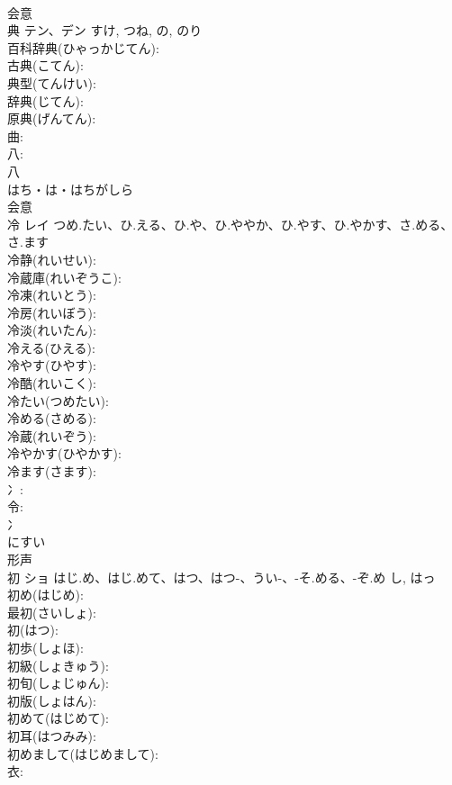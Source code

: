 \documentclass[8pt]{extreport}
\begin{document}
\begin{CJK}{UTF8}{min}
\\	会意 
\\	典	テン、デン		すけ, つね, の, のり	
\\	百科辞典(ひゃっかじてん): 
\\	古典(こてん): 
\\	典型(てんけい): 
\\	辞典(じてん): 
\\	原典(げんてん): 
\\	曲: 
\\	八: 
\\	八	
\\	はち・は・はちがしら	
\\	会意 
\\	冷	レイ	つめ.たい、ひ.える、ひ.や、ひ.ややか、ひ.やす、ひ.やかす、さ.める、さ.ます		
\\	冷静(れいせい): 
\\	冷蔵庫(れいぞうこ): 
\\	冷凍(れいとう): 
\\	冷房(れいぼう): 
\\	冷淡(れいたん): 
\\	冷える(ひえる): 
\\	冷やす(ひやす): 
\\	冷酷(れいこく): 
\\	冷たい(つめたい): 
\\	冷める(さめる): 
\\	冷蔵(れいぞう): 
\\	冷やかす(ひやかす): 
\\	冷ます(さます): 
\\	冫: 
\\	令: 
\\	冫	
\\	にすい	
\\	形声 
\\	初	ショ	はじ.め、はじ.めて、はつ、はつ-、うい-、-そ.める、-ぞ.め	し, はっ	
\\	初め(はじめ): 
\\	最初(さいしょ): 
\\	初(はつ): 
\\	初歩(しょほ): 
\\	初級(しょきゅう): 
\\	初旬(しょじゅん): 
\\	初版(しょはん): 
\\	初めて(はじめて): 
\\	初耳(はつみみ): 
\\	初めまして(はじめまして): 
\\	衣: 

\end{CJK}
\end{document}

